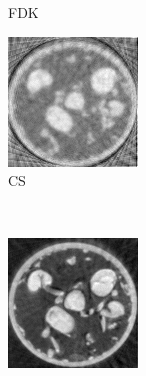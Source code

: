 \documentclass[journal]{IEEEtran}
\begin{document}
\begin{figure}[!h]
\begin{subfigure}[b]{0.3\linewidth}
        \caption{FDK}
    \end{subfigure}
\quad
    \begin{subfigure}[b]{0.3\linewidth}
        \includegraphics[width=\textwidth]{../images/sprouts/csIm.png}
        \caption{CS}
     \end{subfigure}\\
\quad
    \begin{subfigure}[b]{0.3\linewidth}
        \includegraphics[width=\textwidth]{../images/sprouts/plainPriorIm.png}

\end{subfigure}
\end{figure}
\end{document}
